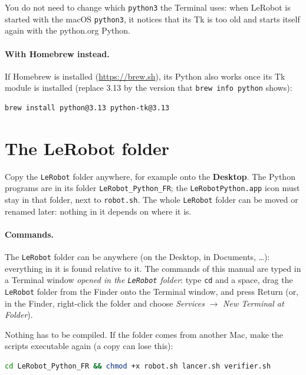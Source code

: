 \documentclass[11pt,a4paper]{article}
\newcommand{\kbd}[1]{\texttt{#1}}
\begin{document}
You do not need to change which \kbd{python3} the Terminal uses: when
LeRobot is started with the macOS \kbd{python3}, it notices that its Tk is
too old and starts itself again with the python.org Python.

\paragraph{With Homebrew instead.} If Homebrew is installed
(\url{https://brew.sh}), its Python also works once its Tk module is
installed (replace 3.13 by the version that \kbd{brew info python} shows):
\begin{lstlisting}[language=bash]
brew install python@3.13 python-tk@3.13
\end{lstlisting}

\section{The LeRobot folder}

Copy the \kbd{LeRobot} folder anywhere, for example onto the
\textbf{Desktop}. The Python programs are in its folder
\kbd{LeRobot\_Python\_FR}; the \kbd{LeRobotPython.app} icon must stay in that
folder, next to \kbd{robot.sh}. The whole \kbd{LeRobot} folder can be moved
or renamed later: nothing in it depends on where it is.

\paragraph{Commands.} The \kbd{LeRobot} folder can be anywhere (on the
Desktop, in Documents, \dots): everything in it is found relative to it.
The commands of this manual are typed in a Terminal window \emph{opened in
the \kbd{LeRobot} folder}: type \kbd{cd} and a space, drag the
\kbd{LeRobot} folder from the Finder onto the Terminal window, and press
Return (or, in the Finder, right-click the folder and choose
\emph{Services} $\rightarrow$ \emph{New Terminal at Folder}).

Nothing has to be compiled. If the folder comes from another Mac, make the
scripts executable again (a copy can lose this):
\begin{lstlisting}[language=bash]
cd LeRobot_Python_FR && chmod +x robot.sh lancer.sh verifier.sh
\end{lstlisting}

\end{document}
